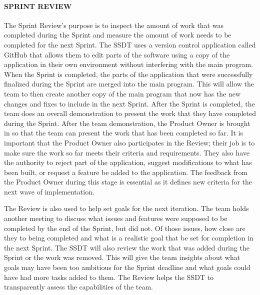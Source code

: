 \paragraph{SPRINT REVIEW}
The Sprint Review's purpose is to inspect the amount of work that was completed during the Sprint and measure the amount of work needs to be completed for the next Sprint. The SSDT uses a version control application called GitHub that allows them to edit parts of the software using a copy of the application  in their own environment without interfering with the main program. When the Sprint is completed, the parts of the application that were successfully finalized during the Sprint are merged into the main program. This will allow the team to then create another copy of the main program that now has the new changes and fixes to include in the next Sprint. After the Sprint is completed, the team does an overall demonstration to present the work that they have completed during the Sprint.  After the team demonstration, the Product Owner is brought in so that the team can present the work that has been completed so far. It is important that the Product Owner also participates in the Review; their job is to make sure the work so far meets their criteria and requirements. They also have the authority to reject part of the application, suggest modifications to what has been built, or request a feature be added to the application. The feedback from the Product Owner during this stage is essential as it defines new criteria for the next wave of implementation.

The Review is also used to help set goals for the next iteration. The team holds another meeting to discuss what issues and features were supposed to be completed by the end of the Sprint, but did not. Of those issues, how close are they to being completed and what is a realistic goal that be set for completion in the next Sprint. The SSDT will also review the work that was added during the Sprint or the work was removed. This will give the team insights about what goals may have been too ambitious for the Sprint deadline and what goals could have had more tasks added to them. The Review helps the SSDT to transparently assess the capabilities of the team.

